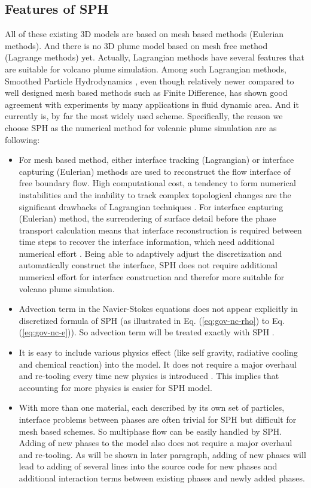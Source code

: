 \documentclass[journal abbreviation, manuscript]{copernicus}
\begin{document}
\subsection{Features of SPH}
All of these existing 3D models are based on mesh based methods (Eulerian methods). And there is no 3D plume model based on mesh free method (Lagrange methods) yet. Actually, Lagrangian methods have several features that are suitable for volcano plume simulation. Among such Lagrangian methods, Smoothed Particle Hydrodynamics \citep{gingold1977smoothed,lucy1977numerical}, even though relatively newer compared to well designed mesh based methods such as Finite Difference, has shown good agreement with experiments by many applications in fluid dynamic area. And it currently is, by far the most widely used scheme. Specifically, the reason we choose SPH as the numerical method for volcanic plume simulation are as following:
\begin{itemize}
\item For mesh based method, either interface tracking (Lagrangian) \citep{harlow1965numerical, wrobel1991computational, cheng1995simplified} or interface capturing (Eulerian) \citep{hirt1981volume, youngs1982time, gerlach2006comparison, gopala2008volume} methods are used to reconstruct the flow interface of free boundary flow. High computational cost, a tendency to form numerical instabilities and the inability to track complex topological changes are the significant drawbacks of Lagrangian techniques \citep{hirt1981volume, unverdi1992front, anderson1998diffuse}. For interface capturing (Eulerian) method, the surrendering of surface detail before the phase transport calculation means that interface reconstruction is required between time steps to recover the interface information, which need additional numerical effort \citep{hirt1981volume, youngs1982time}. Being able to adaptively adjust the discretization and automatically construct the interface, SPH does not require additional numerical effort for interface construction and therefor more suitable for volcano plume simulation.
\item Advection term in the Navier-Stokes equations does not appear explicitly in discretized formula of SPH (as illustrated in Eq. (\ref{eq:gov-nc-rho}) to Eq. (\ref{eq:gov-nc-e})). So advection term will be treated exactly with SPH \citep{monaghan2005smoothed}.
\item It is easy to include various physics effect (like self gravity, radiative cooling and chemical reaction) into the model. It does not require a major overhaul and re-tooling every time new physics is introduced \citep{monaghan1995sph}. This implies that accounting for more physics is easier for SPH model.
\item With more than one material, each described by its own set of particles, interface problems between phases are often trivial for SPH but difficult for mesh based schemes. So multiphase flow can be easily handled by SPH. Adding of new phases to the model also does not require a major overhaul and re-tooling. As will be shown in later paragraph, adding of new phases will lead to adding of several lines into the source code for new phases and additional interaction terms between existing phases and newly added phases.
\end{itemize}
\end{document}
